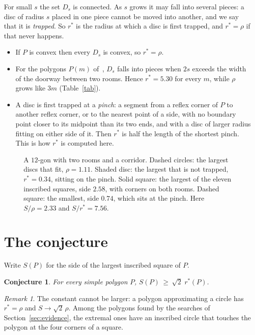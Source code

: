 \documentclass[11pt,a4paper]{article}
\newtheorem{conjecture}{Conjecture}
\theoremstyle{definition}\newtheorem{definition}{Definition}
\theoremstyle{remark}\newtheorem{remark}{Remark}
\begin{document}
For small $s$ the set $D_s$ is connected. As $s$ grows it may fall into several
pieces: a disc of radius $s$ placed in one piece cannot be moved into another,
and we say that it is \emph{trapped}. So $r^*$ is the radius at which a disc is
first trapped, and $r^*=\rho$ if that never happens.

\begin{itemize}
\item If $P$ is convex then every $D_s$ is convex, so $r^*=\rho$.
\item For the polygons $P(m)$ of~\cite{small}, $D_s$ falls into pieces when $2s$
exceeds the width of the doorway between two rooms. Hence $r^*=5.30$ for every
$m$, while $\rho$ grows like $3m$ (Table~\ref{tab}).
\item A disc is first trapped at a \emph{pinch}: a segment from a reflex corner
of $P$ to another reflex corner, or to the nearest point of a side, with no
boundary point closer to its midpoint than its two ends, and with a disc of
larger radius fitting on either side of it. Then $r^*$ is half the length of the
shortest pinch. This is how $r^*$ is computed here.
\end{itemize}

\begin{figure}[H]\centering

\caption{A $12$-gon with two rooms and a corridor. Dashed circles: the largest
discs that fit, $\rho=1.11$. Shaded disc: the largest that is not trapped,
$r^*=0.34$, sitting on the pinch. Solid square: the largest of the eleven
inscribed squares, side $2.58$, with corners on both rooms. Dashed square: the
smallest, side $0.74$, which sits at the pinch. Here $S/\rho=2.33$ and
$S/r^*=7.56$.}\label{fig}
\end{figure}

\section{The conjecture}

Write $S(P)$ for the side of the largest inscribed square of $P$.

\begin{conjecture}\label{conj}
For every simple polygon $P$, \quad $S(P)\ \ge\ \sqrt2\; r^*(P)$.
\end{conjecture}

\begin{remark}
The constant cannot be larger: a polygon approximating a circle has
$r^*=\rho$ and $S\to\sqrt2\,\rho$. Among the polygons found by the searches of
Section~\ref{sec:evidence}, the extremal ones have an inscribed circle that
touches the polygon at the four corners of a square.
\end{remark}
\end{document}
